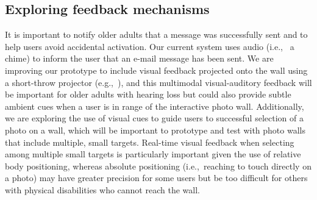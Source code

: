 \documentclass{chi-ext}
\begin{document}
\subsection{Exploring feedback mechanisms}
It is important to notify older adults that a message was successfully sent and to help users avoid accidental activation. Our current system uses audio (i.e., ~a chime) to inform the user that an e-mail message has been sent. We are improving our prototype to include visual feedback projected onto the wall using a short-throw projector (e.g.,~\cite{Wilson2010}), and this multimodal visual-auditory feedback will be important for older adults with hearing loss but could also provide subtle ambient cues when a user is in range of the interactive photo wall. Additionally, we are exploring the use of visual cues to guide users to successful selection of a photo on a wall, which will be important to prototype and test with photo walls that include multiple, small targets. Real-time visual feedback when selecting among multiple small targets is particularly important given the use of relative body positioning, whereas absolute positioning (i.e.,~reaching to touch directly on a photo) may have greater precision for some users but be too difficult for others with physical disabilities who cannot reach the wall. %
\end{document}
